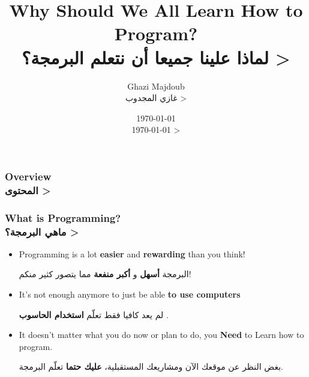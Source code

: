 \documentclass[9pt]{beamer}
\begin{document}

\title{		Why Should We All Learn How to Program?\\ 
			\<
			لماذا علينا جميعا أن نتعلم البرمجة؟
			>
} %
\author{	Ghazi Majdoub\\
			\< 
			غازي المجدوب
			>
}
\date{
			\today\\
			\<
			\today
			>
}

	\begin{frame}
		\titlepage
	\end{frame}
	
	\begin{frame}
		\frametitle{
			Overview\\
			\<
			المحتوى
			>
		}
		\tableofcontents
	\end{frame}
	
	
	\begin{frame}
		\frametitle{
			What is Programming?\\
			\<
			ماهي البرمجة؟
			>
		}
		
		\begin{itemize}
			\item	Programming is a lot \textbf{easier} and \textbf{rewarding} than you think!
					\begin{arabtext}
					البرمجة
					\textbf{
						أسهل
					}
					و
					\textbf
					{
						أكبر منفعة
					}
					مما يتصور كثير منكم!
					\end{arabtext}
			\item 	It's not enough anymore to just be able \textbf{to use computers}
					\begin{arabtext}
					لم يعد كافيا فقط تعلّم 
					\textbf{
						استخدام الحاسوب
					}.
					\end{arabtext}
			\item 	It doesn't matter what you do now or plan to do, you \textbf{Need} to Learn how to program.
					\begin{arabtext}
					بغض النظر عن موقعك الآن ومشاريعك المستقبلية،
					\textbf{
						عليك حتما
					}
					تعلّم البرمجة.
					\end{arabtext}
		\end{itemize}
	\end{frame}
	
\end{document}
